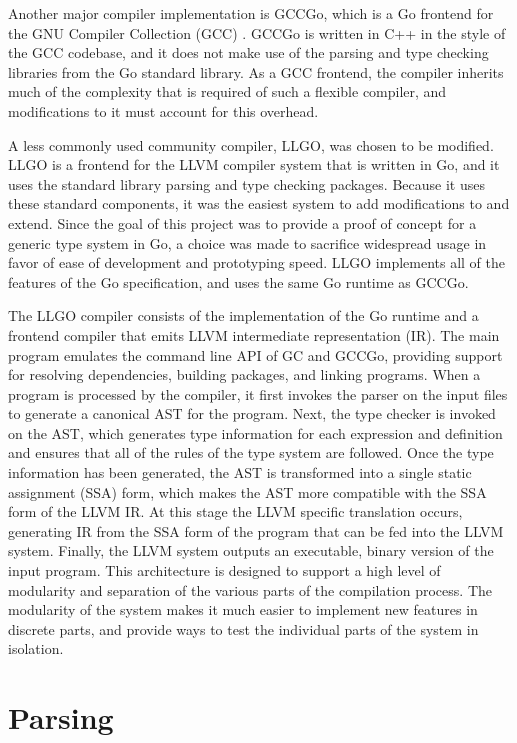 \documentclass[letterpaper,twocolumn,11pt]{article}
\begin{document}
 Another major compiler implementation is GCCGo, which is a Go frontend for the GNU Compiler Collection (GCC) \cite{gcc}. GCCGo is written in C++ in the style of the GCC codebase, and it does not make use of the parsing and type checking libraries from the Go standard library. As a GCC frontend, the compiler inherits much of the complexity that is required of such a flexible compiler, and modifications to it must account for this overhead.

A less commonly used community compiler, LLGO, was chosen to be modified. LLGO is a frontend for the LLVM compiler system \cite{llvm} that is written in Go, and it uses the standard library parsing and type checking packages. Because it uses these standard components, it was the easiest system to add modifications to and extend. Since the goal of this project was to provide a proof of concept for a generic type system in Go, a choice was made to sacrifice widespread usage in favor of ease of development and prototyping speed. LLGO implements all of the features of the Go specification, and uses the same Go runtime as GCCGo.

The LLGO compiler consists of the implementation of the Go runtime and a frontend compiler that emits LLVM intermediate representation (IR). The main program emulates the command line API of GC and GCCGo, providing support for resolving dependencies, building packages, and linking programs. When a program is processed by the compiler, it first invokes the parser on the input files to generate a canonical AST for the program. Next, the type checker is invoked on the AST, which generates type information for each expression and definition and ensures that all of the rules of the type system are followed. Once the type information has been generated, the AST is transformed into a single static assignment (SSA) \cite{ssa} form, which makes the AST more compatible with the SSA form of the LLVM IR. At this stage the LLVM specific translation occurs, generating IR from the SSA form of the program that can be fed into the LLVM system. Finally, the LLVM system outputs an executable, binary version of the input program. This architecture is designed to support a high level of modularity and separation of the various parts of the compilation process. The modularity of the system makes it much easier to implement new features in discrete parts, and provide ways to test the individual parts of the system in isolation.

\section{Parsing} \label{parsing}
\end{document}
